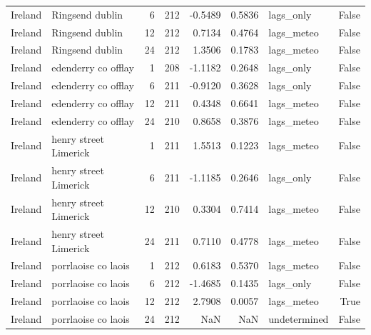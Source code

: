 \begin{tabular}{llrrrrlr}
Ireland & Ringsend dublin & 6 & 212 & -0.5489 & 0.5836 & lags\_only & False \\
Ireland & Ringsend dublin & 12 & 212 & 0.7134 & 0.4764 & lags\_meteo & False \\
Ireland & Ringsend dublin & 24 & 212 & 1.3506 & 0.1783 & lags\_meteo & False \\
Ireland & edenderry co offlay & 1 & 208 & -1.1182 & 0.2648 & lags\_only & False \\
Ireland & edenderry co offlay & 6 & 211 & -0.9120 & 0.3628 & lags\_only & False \\
Ireland & edenderry co offlay & 12 & 211 & 0.4348 & 0.6641 & lags\_meteo & False \\
Ireland & edenderry co offlay & 24 & 210 & 0.8658 & 0.3876 & lags\_meteo & False \\
Ireland & henry street Limerick & 1 & 211 & 1.5513 & 0.1223 & lags\_meteo & False \\
Ireland & henry street Limerick & 6 & 211 & -1.1185 & 0.2646 & lags\_only & False \\
Ireland & henry street Limerick & 12 & 210 & 0.3304 & 0.7414 & lags\_meteo & False \\
Ireland & henry street Limerick & 24 & 211 & 0.7110 & 0.4778 & lags\_meteo & False \\
Ireland & porrlaoise co laois & 1 & 212 & 0.6183 & 0.5370 & lags\_meteo & False \\
Ireland & porrlaoise co laois & 6 & 212 & -1.4685 & 0.1435 & lags\_only & False \\
Ireland & porrlaoise co laois & 12 & 212 & 2.7908 & 0.0057 & lags\_meteo & True \\
Ireland & porrlaoise co laois & 24 & 212 & NaN & NaN & undetermined & False \\
\bottomrule
\end{tabular}
